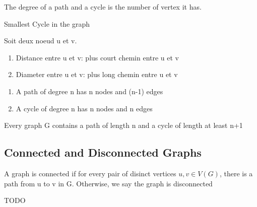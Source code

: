 \documentclass{article}
\begin{document}
\begin{definition}
    The degree of a path and a cycle is the number of vertex it has.
\end{definition}

\begin{definition}[Girth]
    Smallest Cycle in the graph
\end{definition}

\begin{definition}
    Soit deux noeud u et v.
    \begin{enumerate}
	\item Distance entre u et v: plus court chemin entre u et v
	\item Diameter entre u et v: plus long chemin entre u et v
    \end{enumerate}
\end{definition}

\begin{theorem}
    \begin{enumerate}
	\item A path of degree n has n nodes and (n-1) edges
	\item A cycle of degree n has n nodes and n edges
    \end{enumerate}
\end{theorem}

\begin{proposition}
    Every graph G contains a path of length n and a cycle of length
    at least n+1
\end{proposition}

\subsection{Connected and Disconnected Graphs}%
\label{sub:Connected Graphs}

\begin{definition}
    A graph is connected if for every pair of disinct vertices $ u,v \in
    V(G)$, there is a path from u to v in G. Otherwise, we say the
    graph is disconnected
\end{definition}

\begin{definition}
\end{definition}

\begin{definition}
    TODO
\end{definition}
\end{document}
